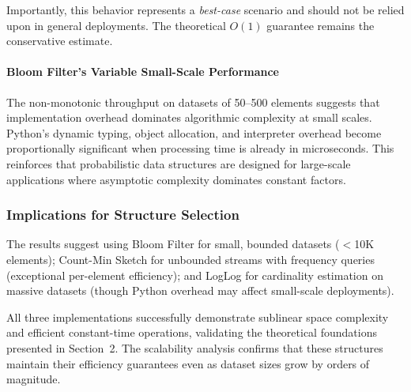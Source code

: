 Importantly, this behavior represents a \emph{best-case} scenario and should not be relied upon in general deployments. The theoretical $O(1)$ guarantee remains the conservative estimate.

\paragraph{Bloom Filter's Variable Small-Scale Performance}

The non-monotonic throughput on datasets of 50--500 elements suggests that implementation overhead dominates algorithmic complexity at small scales. Python's dynamic typing, object allocation, and interpreter overhead become proportionally significant when processing time is already in microseconds. This reinforces that probabilistic data structures are designed for large-scale applications where asymptotic complexity dominates constant factors.

\subsubsection{Implications for Structure Selection}

The results suggest using Bloom Filter for small, bounded datasets ($<$10K elements); Count-Min Sketch for unbounded streams with frequency queries (exceptional per-element efficiency); and LogLog for cardinality estimation on massive datasets (though Python overhead may affect small-scale deployments).

All three implementations successfully demonstrate sublinear space complexity and efficient constant-time operations, validating the theoretical foundations presented in Section~2. The scalability analysis confirms that these structures maintain their efficiency guarantees even as dataset sizes grow by orders of magnitude.
